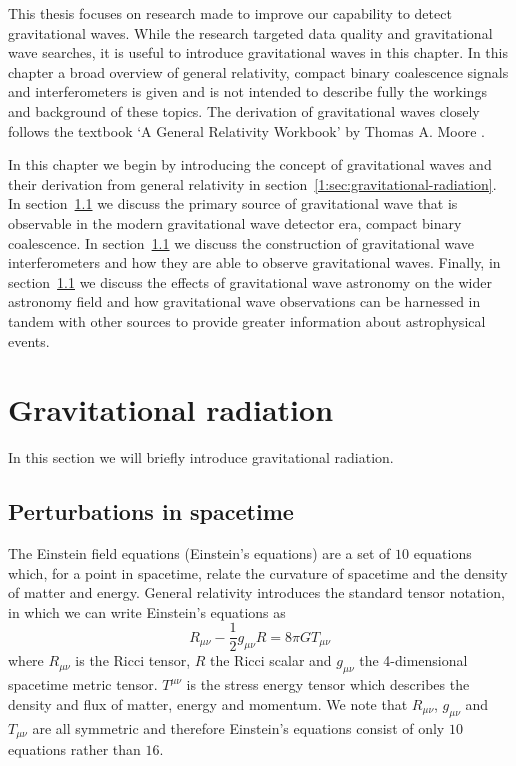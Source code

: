 
This thesis focuses on research made to improve our capability to detect gravitational waves. While the research targeted data quality and gravitational wave searches, it is useful to introduce gravitational waves in this chapter. In this chapter a broad overview of general relativity, compact binary coalescence signals and interferometers is given and is not intended to describe fully the workings and background of these topics. The derivation of gravitational waves closely follows the textbook `A General Relativity Workbook' by Thomas A. Moore \cite{moore_2013}.

In this chapter we begin by introducing the concept of gravitational waves and their derivation from general relativity in section~\ref{1:sec:gravitational-radiation}. In section~\ref{} we discuss the primary source of gravitational wave that is observable in the modern gravitational wave detector era, compact binary coalescence. In section~\ref{} we discuss the construction of gravitational wave interferometers and how they are able to observe gravitational waves. Finally, in section~\ref{} we discuss the effects of gravitational wave astronomy on the wider astronomy field and how gravitational wave observations can be harnessed in tandem with other sources to provide greater information about astrophysical events.

\section{\label{1:sec:gravitational-radiation}Gravitational radiation}

In this section we will briefly introduce gravitational radiation.

\subsection{\label{1:sec:perturbations}Perturbations in spacetime}

The Einstein field equations (Einstein's equations) are a set of $10$ equations which, for a point in spacetime, relate the curvature of spacetime and the density of matter and energy. General relativity introduces the standard tensor notation, in which we can write Einstein's equations as
%
\begin{equation}
   R_{\mu \nu} - \frac{1}{2}g_{\mu \nu}R = 8 \pi G T_{\mu \nu}
   \label{2:eqn:EFE}
\end{equation}
%
where $R_{\mu \nu}$ is the Ricci tensor, $R$ the Ricci scalar and $g_{\mu \nu}$ the 4-dimensional spacetime metric tensor. $T^{\mu \nu}$ is the stress energy tensor which describes the density and flux of matter, energy and momentum. We note that $R_{\mu \nu}$, $g_{\mu \nu}$ and $T_{\mu \nu}$ are all symmetric and therefore Einstein's equations consist of only $10$ equations rather than $16$.

